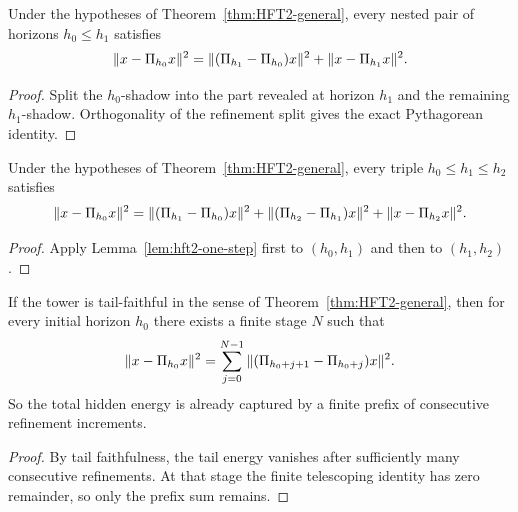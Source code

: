 \begin{lemma}
\label{lem:hft2-one-step}
Under the hypotheses of Theorem~\ref{thm:HFT2-general}, every nested pair of horizons $h_0 \le h_1$ satisfies
\[
\|x - \Pi_{h_0} x\|^2
=
\|(\Pi_{h_1} - \Pi_{h_0})x\|^2 + \|x - \Pi_{h_1} x\|^2.
\]
\end{lemma}

\begin{proof}
Split the $h_0$-shadow into the part revealed at horizon $h_1$ and the remaining $h_1$-shadow.
Orthogonality of the refinement split gives the exact Pythagorean identity.
\end{proof}

\begin{corollary}
\label{cor:hft2-three-level}
Under the hypotheses of Theorem~\ref{thm:HFT2-general}, every triple $h_0 \le h_1 \le h_2$ satisfies
\[
\|x - \Pi_{h_0} x\|^2
=
\|(\Pi_{h_1} - \Pi_{h_0})x\|^2
+ \|(\Pi_{h_2} - \Pi_{h_1})x\|^2
+ \|x - \Pi_{h_2} x\|^2.
\]
\end{corollary}

\begin{proof}
Apply Lemma~\ref{lem:hft2-one-step} first to $(h_0,h_1)$ and then to $(h_1,h_2)$.
\end{proof}

\begin{proposition}
\label{prop:hft2-prefix-exact}
If the tower is tail-faithful in the sense of
Theorem~\ref{thm:HFT2-general}, then for every initial horizon $h_0$ there
exists a finite stage $N$ such that
\[
\|x - \Pi_{h_0} x\|^2
=
\sum_{j=0}^{N-1} \|(\Pi_{h_0+j+1} - \Pi_{h_0+j})x\|^2.
\]
So the total hidden energy is already captured by a finite prefix of consecutive refinement increments.
\end{proposition}

\begin{proof}
By tail faithfulness, the tail energy vanishes after sufficiently many
consecutive refinements.
At that stage the finite telescoping identity has zero remainder, so only the prefix sum remains.
\end{proof}


